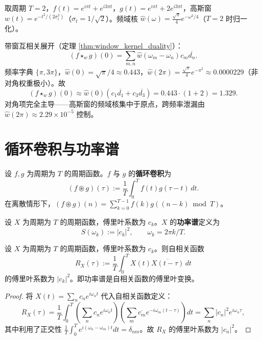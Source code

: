 \begin{example}\label{ex:window_kernel_numerical}
取周期 $T = 2$，$f(t) = e^{i\pi t} + e^{i3\pi t}$，$g(t) = e^{i\pi t} + 2e^{i3\pi t}$，高斯窗 $w(t) = e^{-t^2/(2\sigma_t^2)}$（$\sigma_t = 1/\sqrt{2}$）。频域核 $\widehat{w}(\omega) = \frac{\sqrt{\pi}}{4} e^{-\omega^2/4}$（$T=2$ 时归一化）。

带窗互相关展开（定理 \ref{thm:window_kernel_duality}）：
\[
(f \star_w g)(0) = \sum_{m,n} \widehat{w}(\omega_m - \omega_n) c_m \overline{d_n}.
\]
频率字典 $\{\pi, 3\pi\}$，$\widehat{w}(0) = \sqrt{\pi}/4 \approx 0.443$，$\widehat{w}(2\pi) = \frac{\sqrt{\pi}}{4} e^{-\pi^2} \approx 0.0000229$（非对角权重极小）。故
\[
(f \star_w g)(0) \approx \widehat{w}(0)(c_1\overline{d_1} + c_3\overline{d_3}) = 0.443 \cdot (1 + 2) = 1.329.
\]
对角项完全主导——高斯窗的频域核集中于原点，跨频率泄漏由 $\widehat{w}(2\pi) \approx 2.29 \times 10^{-5}$ 控制。
\end{example}

\section{\texorpdfstring{循环卷积与功率谱}{循环卷积与功率谱}}

\begin{definition}[循环卷积]\label{def:circular_convolution_harmonic}
设 $f, g$ 为周期为 $T$ 的周期函数。$f$ 与 $g$ 的\textbf{循环卷积}为
\[
(f \circledast g)(\tau) := \frac{1}{T}\int_0^T f(t) g(\tau - t)\, dt.
\]
在离散情形下，$(f \circledast g)(n) = \sum_{k=0}^{T-1} f(k) g((n-k) \bmod T)$。
\end{definition}

\begin{definition}[功率谱]\label{def:periodic_tendency_spectrum}
设 $X$ 为周期为 $T$ 的周期函数，傅里叶系数为 $c_k$。$X$ 的\textbf{功率谱}定义为
\[
S(\omega_k) := |c_k|^2, \qquad \omega_k = 2\pi k/T.
\]
\end{definition}

\begin{theorem}[功率谱与自相关函数]\label{thm:spectrum_classical_limit}
设 $X$ 为周期为 $T$ 的周期函数，傅里叶系数为 $c_k$。则自相关函数
\[
R_X(\tau) := \frac{1}{T}\int_0^T X(t) \overline{X(t-\tau)}\, dt
\]
的傅里叶系数为 $|c_k|^2$。即功率谱是自相关函数的傅里叶变换。
\end{theorem}

\begin{proof}
将 $X(t) = \sum_n c_n e^{i\omega_n t}$ 代入自相关函数定义：
\[
R_X(\tau) = \frac{1}{T}\int_0^T \left(\sum_n c_n e^{i\omega_n t}\right)\left(\sum_m \overline{c_m} e^{-i\omega_m (t-\tau)}\right) dt = \sum_n |c_n|^2 e^{i\omega_n \tau},
\]
其中利用了正交性 $\frac{1}{T}\int_0^T e^{i(\omega_n - \omega_m)t}dt = \delta_{nm}$。故 $R_X$ 的傅里叶系数为 $|c_n|^2$。
\end{proof}

